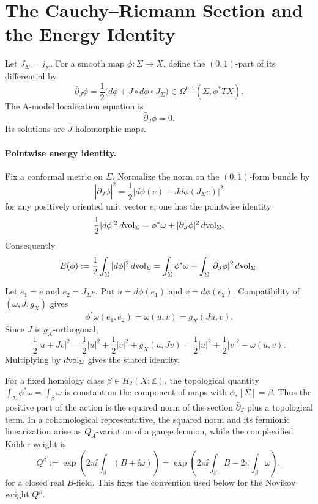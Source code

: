 \section{The Cauchy--Riemann Section and the Energy Identity}

Let \(J_\Sigma=j_\Sigma\).  For a smooth map \(\phi:\Sigma\to X\), define the
\((0,1)\)-part of its differential by
\[
  \bar\partial_J\phi
  =
  \frac12\bigl(d\phi+J\circ d\phi\circ J_\Sigma\bigr)
  \in
  \Omega^{0,1}(\Sigma,\phi^\ast TX).
\]
The A-model localization equation is
\[
  \bar\partial_J\phi=0.
\]
Its solutions are \(J\)-holomorphic maps.

\paragraph{Pointwise energy identity.}
Fix a conformal metric on \(\Sigma\).  Normalize the norm on the
\((0,1)\)-form bundle by
\[
  |\bar\partial_J\phi|^2
  =
  \frac12
  \bigl|d\phi(e)+Jd\phi(J_\Sigma e)\bigr|^2
\]
for any positively oriented unit vector \(e\), one has the pointwise identity
\[
  \frac12 |d\phi|^2\,d{\rm vol}_\Sigma
  =
  \phi^\ast\omega
  +
  |\bar\partial_J\phi|^2\,d{\rm vol}_\Sigma .
\]
Consequently
\[
  E(\phi)
  :=
  \frac12\int_\Sigma |d\phi|^2\,d{\rm vol}_\Sigma
  =
  \int_\Sigma\phi^\ast\omega
  +
  \int_\Sigma|\bar\partial_J\phi|^2\,d{\rm vol}_\Sigma .
\]

Let \(e_1=e\) and \(e_2=J_\Sigma e\).  Put
\(u=d\phi(e_1)\) and \(v=d\phi(e_2)\).  Compatibility of
\((\omega,J,g_X)\) gives
\[
  \phi^\ast\omega(e_1,e_2)=\omega(u,v)=g_X(Ju,v).
\]
Since \(J\) is \(g_X\)-orthogonal,
\[
  \frac12|u+Jv|^2
  =
  \frac12|u|^2+\frac12|v|^2+g_X(u,Jv)
  =
  \frac12|u|^2+\frac12|v|^2-\omega(u,v).
\]
Multiplying by \(d{\rm vol}_\Sigma\) gives the stated identity.

For a fixed homology class \(\beta\in H_2(X;\mathbb Z)\), the topological
quantity \(\int_\Sigma\phi^\ast\omega=\int_\beta\omega\) is constant on the
component of maps with \(\phi_\ast[\Sigma]=\beta\).  Thus the positive part of
the action is the squared norm of the section \(\bar\partial_J\) plus a
topological term.  In a cohomological representative, the squared norm and its
fermionic linearization arise as \(Q_A\)-variation of a gauge fermion, while
the complexified K\"ahler weight is
\[
  Q^\beta
  :=
  \exp\left(2\pi\ii\int_\beta(B+\ii\omega)\right)
  =
  \exp\left(2\pi\ii\int_\beta B-2\pi\int_\beta\omega\right),
\]
for a closed real \(B\)-field.  This fixes the convention used below for the
Novikov weight \(Q^\beta\).

